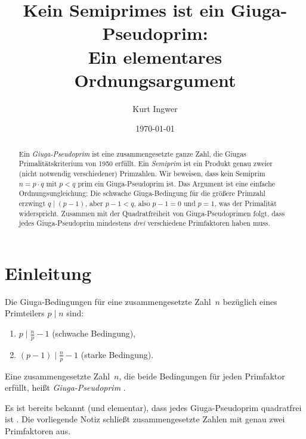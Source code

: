 \documentclass[12pt,a4paper]{amsart}
\theoremstyle{definition}
\begin{document}

\title{Kein Semiprimes ist ein Giuga-Pseudoprim:\\ Ein elementares Ordnungsargument}

\author{Kurt Ingwer}
\address{Specialist Mathematics Project, Version Build 44}
\date{\today}

\begin{abstract}
Ein \emph{Giuga-Pseudoprim} ist eine zusammengesetzte ganze Zahl, die Giugas
Primalitätskriterium von 1950 erfüllt. Ein \emph{Semiprim} ist ein Produkt genau zweier
(nicht notwendig verschiedener) Primzahlen. Wir beweisen, dass kein Semiprim
$n = p \cdot q$ mit $p < q$ prim ein Giuga-Pseudoprim ist. Das Argument ist eine
einfache Ordnungsungleichung: Die schwache Giuga-Bedingung für die größere Primzahl
erzwingt $q \mid (p-1)$, aber $p - 1 < q$, also $p - 1 = 0$ und $p = 1$, was der
Primalität widerspricht. Zusammen mit der Quadratfreiheit von Giuga-Pseudoprimen folgt,
dass jedes Giuga-Pseudoprim mindestens \emph{drei} verschiedene Primfaktoren haben muss.
\end{abstract}

\maketitle

\section{Einleitung}

Die Giuga-Bedingungen für eine zusammengesetzte Zahl~$n$ bezüglich eines Primteilers
$p \mid n$ sind:
\begin{enumerate}
  \item[\textup{(S)}] $p \mid \tfrac{n}{p} - 1$ \quad (schwache Bedingung),
  \item[\textup{(St)}] $(p-1) \mid \tfrac{n}{p} - 1$ \quad (starke Bedingung).
\end{enumerate}
Eine zusammengesetzte Zahl~$n$, die beide Bedingungen für jeden Primfaktor erfüllt,
heißt \emph{Giuga-Pseudoprim} \cite{Borwein1996}.

Es ist bereits bekannt (und elementar), dass jedes Giuga-Pseudoprim quadratfrei ist
\cite{Ingwer2026qfrei}. Die vorliegende Notiz schließt zusammengesetzte Zahlen mit genau
zwei Primfaktoren aus.
\end{document}

